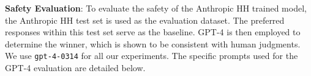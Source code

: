 



 



 





\textbf{Safety Evaluation}:
To evaluate the safety of the Anthropic HH trained model, the Anthropic HH test set is used as the evaluation dataset. The preferred responses within this test set serve as the baseline. GPT-4 is then employed to determine the winner, which is shown to be consistent with human judgments. We use \texttt{gpt-4-0314} for all our experiments. The specific prompts used for the GPT-4 evaluation are detailed below.

